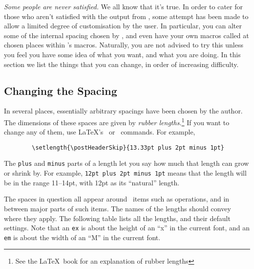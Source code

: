 {{\em Some people are never satisfied.}  We all know that it's true.
In order to cater for those who aren't satisfied with the output from
\Vdm, some attempt has been made to allow a limited degree of
customisation by the user.  In particular, you can alter some of the
internal spacing chosen by \Vdm, and even have your own macros called
at chosen places within \Vdm's macros.  Naturally, you are not advised
to try this unless you feel you have some idea of what you want, and
what you are doing.  In this section we list the things that you can
change, in order of increasing difficulty.

\subsection*{Changing the Spacing}

In several places, essentially arbitrary spacings have been chosen by
the author.  The dimensions of these spaces are given by {\em rubber
lengths.}\footnote{See the \LaTeX\ book for an explanation of rubber
lengths}  If you want to change any of them, use \LaTeX's
\cs\setlength\ or \cs\addtolength\ commands.
For example,
\begin{verbatim}
        \setlength{\postHeaderSkip}{13.33pt plus 2pt minus 1pt}
\end{verbatim}

\begin{dangerous}
The {\tt plus} and {\tt minus} parts of a length let you say how much
that length can grow or shrink by.  For example, {\tt 12pt plus 2pt
minus 1pt} means that the length will be in the range 11--14pt, with
12pt as its ``natural'' length.
\end{dangerous}

The spaces in question all appear around \Vdm\ items such as
operations, and in between major parts of such items.  The names of
the lengths should convey where they apply.  The following table lists
all the lengths, and their default settings.  Note that an {\tt ex} is
about the height of an ``x'' in the current font, and an {\tt em} is
about the width of an ``M'' in the current font.

}
